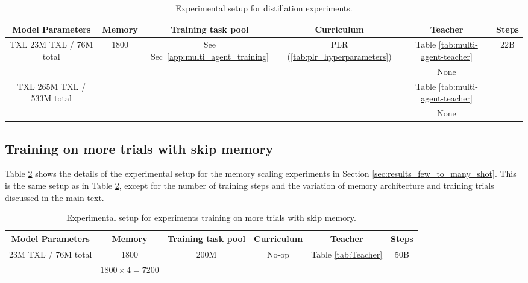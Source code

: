\begin{table}[h!]
  \begin{center}
    \caption{Experimental setup for distillation experiments.}
    \begin{tabular}{c|c|c|c|c|c}
    \label{tab:distillation-exp}
      Model Parameters & Memory & Training task pool & Curriculum & Teacher & Steps\\
      \hline
      \multirow{2}{*}{TXL 23M TXL / 76M total} & \multirow{4}{*}{1800} & \multirow{4}{*}{See Sec~\ref{app:multi_agent_training}} & \multirow{4}{*}{PLR (\ref{tab:plr_hyperparameters})} &Table \ref{tab:multi-agent-teacher} & \multirow{4}{*}{22B}\\
      &&&&None&\\
      \multirow{2}{*}{TXL 265M TXL / 533M total}&&&& Table \ref{tab:multi-agent-teacher}&\\
      &&&&None&\\
    \end{tabular}
  \end{center}
\end{table}

\subsection{Training on more trials with skip memory}
\label{app:skip-memory-scaling}
Table \ref{tab:skip-memory-scaling} shows the details of the experimental setup for the memory scaling experiments in Section \ref{sec:results_few_to_many_shot}. This is the same setup as in Table \ref{tab:skip-memory-scaling}, except for the number of training steps and the variation of memory architecture and training trials discussed in the main text.

\begin{table}[h!]
  \begin{center}
    \caption{Experimental setup for experiments training on more trials with skip memory.}
    \begin{tabular}{c|c|c|c|c|c}
    \label{tab:skip-memory-scaling}
      Model Parameters & Memory & Training task pool & Curriculum & Teacher & Steps \\
      \hline
      \multirow{2}{*}{23M TXL / 76M total} & 1800 & \multirow{2}{*}{200M} & 
      \multirow{2}{*}{No-op} & 
      \multirow{2}{*}{Table \ref{tab:Teacher}} & \multirow{2}{*}{50B}\\
      & $1800 \times 4=7200$ &&&&\\
    \end{tabular}
  \end{center}
\end{table}
